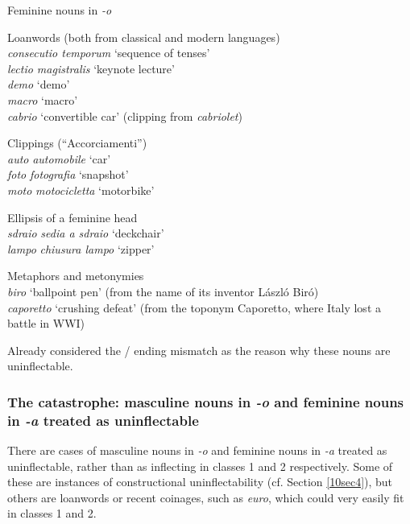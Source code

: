 \documentclass[output=paper,colorlinks,citecolor=brown]{langscibook}
\begin{document}
\begin{exe}
	\ex \label{10ex12}
		Feminine nouns in \emph{-o}
	\begin{xlist}
		\ex Loanwords (both from classical and modern languages) \\
		\emph{consecutio temporum} ‘sequence of tenses’\\
		\emph{lectio magistralis} ‘keynote lecture’\\
		\emph{demo} ‘demo’ \\
		\emph{macro} ‘macro’ \\
		\emph{cabrio} ‘convertible car’ (clipping from \emph{cabriolet})
		
		\ex Clippings (“Accorciamenti”) \\
		\emph{auto} \leftarrow \emph{automobile} ‘car’\\
		\emph{foto} \leftarrow \emph{fotografia} ‘snapshot’\\
		\emph{moto} \leftarrow \emph{motocicletta} ‘motorbike’
		
		\ex Ellipsis of a feminine head \\
		\emph{sdraio} \leftarrow \emph{sedia a sdraio} ‘deckchair’\\
		\emph{lampo} \leftarrow \emph{chiusura lampo} ‘zipper’
		
		\ex Metaphors and metonymies \\
		\emph{biro} ‘ballpoint pen’ (from the name of its inventor László Biró)\\
		\emph{caporetto} ‘crushing defeat’ (from the toponym Caporetto, where Italy lost a battle in WWI)
	\end{xlist}
\end{exe}

Already \citet[106]{migliorini1957} considered the  / ending mismatch as the reason why these nouns are uninflectable.

\subsubsection{The catastrophe: masculine nouns in \emph{-o} and feminine nouns in \emph{-a} treated as uninflectable}

There are cases of masculine nouns in \emph{-o} and feminine nouns in \emph{-a} treated as uninflectable, rather than as inflecting in classes 1 and 2 respectively. Some of these are instances of constructional uninflectability (cf. Section \ref{10sec4}), but others are loanwords or recent coinages, such as \emph{euro}, which could very easily fit in classes 1 and 2.
\end{document}
